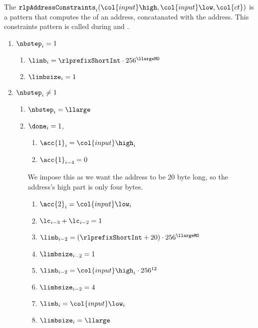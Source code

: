 The $\texttt{rlpAddressConstraints}_{i}(\col{input}\high, \col{input}\low, \col{ct})$ is a pattern that computes the \rlp{} of an address, concatanated with the address.
This constraints pattern is called during \phaseTo{} and \phaseAccessList{}.
\newline
\begin{enumerate} 
    \item \If $\nbstep_{i}=1$ \Then
    \begin{enumerate}
        \item $\limb_{i}=\rlprefixShortInt\cdot256^{\llargeMO}$
        \item $\limbsize_{i}=1$
    \end{enumerate}

    \item \If $\nbstep_{i} \neq 1 $ \Then
    \begin{enumerate} 
        \item $\nbstep_{i}=\llarge$
        \item \If $\done_{i}=1$, \Then 
        \begin{enumerate}
            \item $\acc{1}_{i}=\col{input}\high_{i}$
            \item $\acc{1}_{i-4}=0$ 
        \end{enumerate}
        We impose this as we want the address to be 20 byte long, so the address's high part is only four bytes.
        \begin{enumerate}[resume]
            \item $\acc{2}_{i}=\col{input}\low_{i}$
            \item $\lc_{i-3}+\lc_{i-2}=1$
            \item $\limb_{i-2}=(\rlprefixShortInt+20)\cdot256^{\llargeMO}$
            \item $\limbsize_{i-2}=1$
            \item $\limb_{i-2}=\col{input}\high_{i}\cdot256^{12}$
            \item $\limbsize_{i-2}=4$
            \item $\limb_{i}=\col{input}\low_{i}$
            \item $\limbsize_{i}=\llarge$
        \end{enumerate}     
    \end{enumerate}

\end{enumerate}

    
